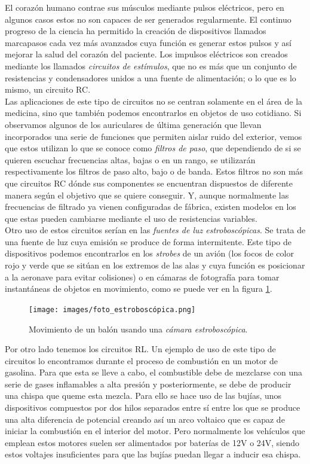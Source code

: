 \documentclass[../main.tex]{subfiles}
\begin{document}
El corazón humano contrae sus músculos mediante pulsos eléctricos, pero en algunos casos estos no son capaces de ser generados regularmente. El continuo progreso de la ciencia ha permitido la creación de dispositivos llamados marcapasos cada vez más avanzados cuya función es generar estos pulsos y así mejorar la salud del corazón del paciente. Los impulsos eléctricos son creados mediante los llamados \textit{circuitos de estímulos}, que no es más que un conjunto de resistencias y condensadores unidos a una fuente de alimentación; o lo que es lo mismo, un circuito RC. \cite{intro_circuitos_RC} \\

Las aplicaciones de este tipo de circuitos no se centran solamente en el área de la medicina, sino que también podemos encontrarlos en objetos de uso cotidiano. Si observamos algunos de los auriculares de última generación que llevan incorporados una serie de funciones que permiten aislar ruido del exterior, vemos que estos utilizan lo que se conoce como \textit{filtros de paso}, que dependiendo de si se quieren escuchar frecuencias altas, bajas o en un rango, se utilizarán respectivamente los filtros de paso alto, bajo o de banda. Estos filtros no son más que circuitos RC dónde sus componentes se encuentran dispuestos de diferente manera según el objetivo que se quiere conseguir. Y, aunque normalmente las frecuencias de filtrado ya vienen configuradas de fábrica, existen modelos en los que estas pueden cambiarse mediante el uso de resistencias variables.\\

Otro uso de estos circuitos serían en las \textit{fuentes de luz estroboscópicas}. Se trata de una fuente de luz cuya emisión se produce de forma intermitente. Este tipo de dispositivos podemos encontrarlos en los \textit{strobes} de un avión (los focos de color rojo y verde que se sitúan en los extremos de las alas y cuya función es posicionar a la aeronave para evitar colisiones) o en cámaras de fotografía para tomar instantáneas de objetos en movimiento, como se puede ver en la figura \ref{foto_estroboscópica}.

\begin{figure}[!h]
          \centering
          \texttt{[image: images/foto\_estroboscópica.png]}
          \caption{Movimiento de un balón usando una \textit{cámara estroboscópica}.}
          \label{foto_estroboscópica}
\end{figure}

Por otro lado tenemos los circuitos RL. Un ejemplo de uso de este tipo de circuitos lo encontramos durante el proceso de combustión en un motor de gasolina. Para que esta se lleve a cabo, el combustible debe de mezclarse con una serie de gases inflamables a alta presión y posteriormente, se debe de producir una chispa que queme esta mezcla. Para ello se hace uso de las bujías, unos dispositivos compuestos por dos hilos separados entre sí entre los que se produce una alta diferencia de potencial creando así un arco voltaico que es capaz de iniciar la combustión en el interior del motor. Pero normalmente los vehículos que emplean estos motores suelen ser alimentados por baterías de 12V o 24V, siendo estos voltajes insuficientes para que las bujías puedan llegar a inducir esa chispa.
\end{document}
